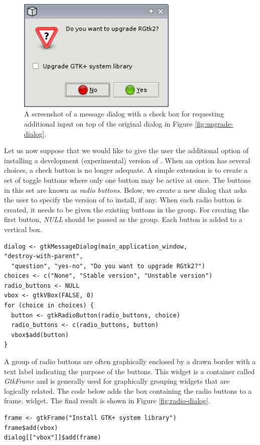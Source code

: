 \documentclass[article]{jss}
\begin{document}
\begin{figure}
\begin{center}
\includegraphics[width=3in]{checkbox-dialog.png}
\caption{\label{fig:checkbox-dialog}A screenshot of a message dialog
with a 
check box for requesting additional input on top of the
original dialog in Figure \ref{fig:upgrade-dialog}.}
\end{center}
\end{figure}

Let us now suppose that we would like to give the user the additional
option of
installing a development (experimental) version of .
When an option has several choices, a check button is no longer
adequate. A
simple extension is to create a set of toggle buttons where only one
button
may be active at once. The buttons in this set are known as
\emph{radio buttons}.
Below, we create a new dialog that asks the user to specify the
version of 
to install, if any. When each radio button is created, it needs to be
given the existing buttons
in the group. For creating the first button, \emph{NULL} should be
passed as the group.
Each button is added to a vertical box. 
\begin{verbatim}
dialog <- gtkMessageDialog(main_application_window,
"destroy-with-parent", 
  "question", "yes-no", "Do you want to upgrade RGtk2?")
choices <- c("None", "Stable version", "Unstable version")
radio_buttons <- NULL
vbox <- gtkVBox(FALSE, 0)
for (choice in choices) {
  button <- gtkRadioButton(radio_buttons, choice)
  radio_buttons <- c(radio_buttons, button)
  vbox$add(button)
}
\end{verbatim}
A group of radio buttons are often graphically enclosed by a drawn
border with a text label indicating the purpose of the buttons. This
widget is a container 
called \emph{GtkFrame} and is generally used for graphically grouping
widgets that are
logically related. The code below adds the box containing the radio
buttons
to a frame.
widget.
The final result is shown in Figure \ref{fig:radio-dialog}.
\begin{verbatim}
frame <- gtkFrame("Install GTK+ system library")
frame$add(vbox)
dialog[["vbox"]]$add(frame)
\end{verbatim}
\end{document}
